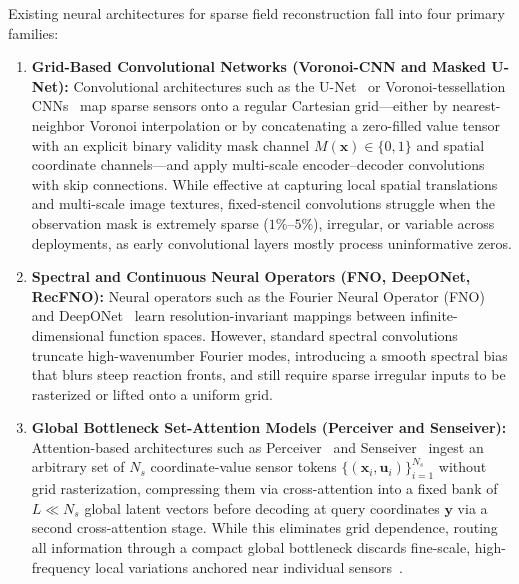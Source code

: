 Existing neural architectures for sparse field reconstruction fall into four primary families:
\begin{enumerate}
    \item \textbf{Grid-Based Convolutional Networks (Voronoi-CNN and Masked U-Net):} Convolutional architectures such as the U-Net~\cite{ronneberger2015unet} or Voronoi-tessellation CNNs~\cite{fukami2021global} map sparse sensors onto a regular Cartesian grid---either by nearest-neighbor Voronoi interpolation or by concatenating a zero-filled value tensor with an explicit binary validity mask channel $M(\mathbf{x}) \in \{0, 1\}$ and spatial coordinate channels---and apply multi-scale encoder--decoder convolutions with skip connections. While effective at capturing local spatial translations and multi-scale image textures, fixed-stencil convolutions struggle when the observation mask is extremely sparse ($1\%\text{--}5\%$), irregular, or variable across deployments, as early convolutional layers mostly process uninformative zeros.
    \item \textbf{Spectral and Continuous Neural Operators (FNO, DeepONet, RecFNO):} Neural operators such as the Fourier Neural Operator (FNO)~\cite{li2021fourier, zhao2024recfno} and DeepONet~\cite{lu2021learning} learn resolution-invariant mappings between infinite-dimensional function spaces. However, standard spectral convolutions truncate high-wavenumber Fourier modes, introducing a smooth spectral bias that blurs steep reaction fronts, and still require sparse irregular inputs to be rasterized or lifted onto a uniform grid.
    \item \textbf{Global Bottleneck Set-Attention Models (Perceiver and Senseiver):} Attention-based architectures such as Perceiver~\cite{jaegle2021perceiver} and Senseiver~\cite{santos2023senseiver} ingest an arbitrary set of $N_s$ coordinate-value sensor tokens $\{(\mathbf{x}_i, \mathbf{u}_i)\}_{i=1}^{N_s}$ without grid rasterization, compressing them via cross-attention into a fixed bank of $L \ll N_s$ global latent vectors before decoding at query coordinates $\mathbf{y}$ via a second cross-attention stage. While this eliminates grid dependence, routing all information through a compact global bottleneck discards fine-scale, high-frequency local variations anchored near individual sensors~\cite{wang2026glu}.

\end{enumerate}
